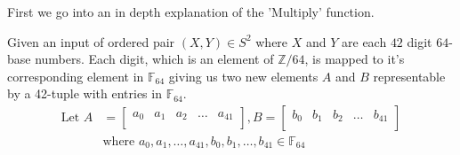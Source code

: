 \documentclass[12pt,letterpaper]{article}
\begin{document}
\begin{itemize}
        First we go into an in depth explanation of the 'Multiply' function.
        
        Given an input of ordered pair $(X,Y)\in S^2$ where $X$ and $Y$ are each $42$ digit $64$-base numbers. Each digit, which is an element of $\mathbb{Z}/64$, is mapped to it's corresponding element in $\mathbb{F}_{64}$ giving us two new elements $A$ and $B$ representable by a 42-tuple with entries in $\mathbb{F}_{64}$.
        \begin{align*}
            \text{Let }A &= 
            \begin{bmatrix}
                a_{0}   & a_{1} & a_{2} & \dots & a_{41} \\
            \end{bmatrix},
            B = 
            \begin{bmatrix}
                b_{0}   & b_{1} & b_{2} & \dots & b_{41} \\
            \end{bmatrix}\\
            &\text{where } a_0,a_1,\dots, a_{41}, b_0,b_1,\dots,b_{41}\in\mathbb{F}_{64}
        \end{align*}
         

\end{itemize}
\end{document}
